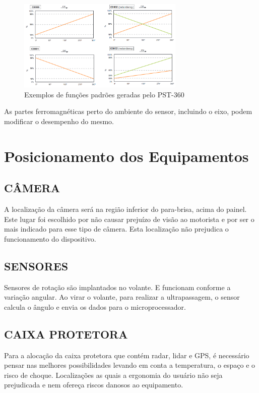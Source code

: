 
\begin{figure}[h]
  \centering
  \includegraphics[width=300px, scale=1]{figuras/pst_saida_padrao}
  \caption{ Exemplos de funções padrões geradas pelo PST-360 \cite{sensor_rotacao}}
\label{fig:pst_saida_padrao}
\end{figure}

As partes ferromagnéticas perto do ambiente do sensor, incluindo o eixo,
podem modificar o desempenho do mesmo.



\section{Posicionamento dos Equipamentos}
\subsection{CÂMERA}
A localização da câmera será na região inferior do para-brisa, acima do painel.
Este lugar foi escolhido por não causar prejuízo de visão ao motorista e por ser o mais
indicado para esse tipo de câmera. Esta localização não prejudica o funcionamento do
dispositivo.

\subsection{SENSORES}
Sensores de rotação são implantados no volante. E funcionam conforme a
variação angular. Ao virar o volante, para realizar a ultrapassagem, o sensor calcula o
ângulo e envia os dados para o microprocessador.

\subsection{CAIXA PROTETORA}
Para a alocação da caixa protetora que contém radar, lidar e GPS, é necessário
pensar nas melhores possibilidades levando em conta a temperatura, o espaço e o risco
de choque. Localizações as quais a ergonomia do usuário não seja prejudicada e nem
ofereça riscos danosos ao equipamento.


